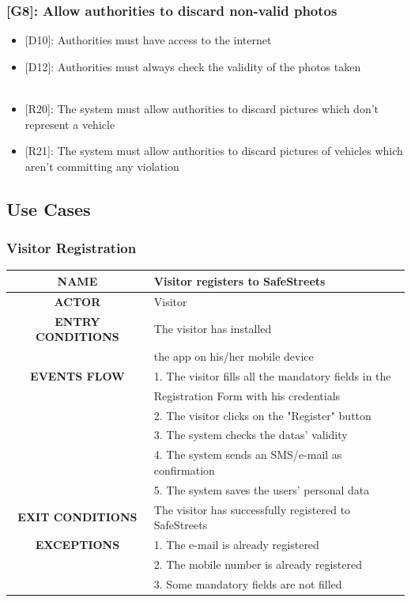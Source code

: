 \documentclass[12pt,a4paper]{article}
\begin{document}
\subsubsection*{{[}{G8}{]}: Allow authorities to discard non-valid photos}
\begin{itemize}
\item {[D10]}: Authorities must have access to the internet
\item {[D12]}: Authorities must always check the validity of the photos taken
\\\\
\item {[R20]}: The system must allow authorities to discard pictures which don't represent a vehicle
\item {[R21]}: The system must allow authorities to discard pictures of vehicles which aren't committing any violation
\end{itemize}
\newpage
\subsection{Use Cases}
	\subsubsection{Visitor Registration}
		\begin{center}
			\begin{tabular}{| c | l |}
				\hline
				\textbf{NAME} & Visitor registers to SafeStreets \\
				\hline
				\textbf{ACTOR} & Visitor \\
				\hline
				\textbf{ENTRY CONDITIONS} & The visitor has installed \\
				&	the app on his/her mobile device \\ \hline
				\textbf{EVENTS FLOW}  &
				1. The visitor fills all the mandatory fields in the\\
				& Registration Form with his credentials\\
				&2. The visitor clicks on the "Register" button\\
				&3. The system checks the datas' validity \\
				&4. The system sends an SMS/e-mail as confirmation\\
				&5. The system saves the users' personal data\\
				\hline
				\textbf{EXIT CONDITIONS}  & The visitor has successfully registered to SafeStreets\\ \hline
				\textbf{EXCEPTIONS} &
				1. The e-mail is already registered\\
				&2. The mobile number is already registered\\
				&3. Some mandatory fields are not filled\\
				\hline
			\end{tabular}
		\end{center}
\end{document}
